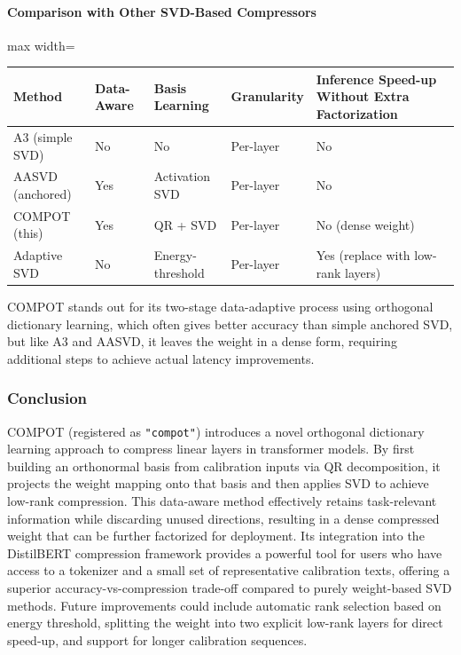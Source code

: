 \paragraph{Comparison with Other SVD-Based Compressors}

\begin{center}
\begin{adjustbox}{max width=\columnwidth}
\renewcommand{\arraystretch}{1.2}
\begin{tabular}{lllll}
\toprule
Method & Data-Aware & Basis Learning & Granularity & Inference Speed-up Without Extra Factorization \\
\midrule
A3 (simple SVD) & No & No & Per-layer & No \\
AASVD (anchored) & Yes & Activation SVD & Per-layer & No \\
COMPOT (this) & Yes & QR + SVD & Per-layer & No (dense weight) \\
Adaptive SVD & No & Energy-threshold & Per-layer & Yes (replace with low-rank layers) \\

\bottomrule
\end{tabular}
\end{adjustbox}
\end{center}
COMPOT stands out for its two-stage data-adaptive process using orthogonal dictionary learning, which often gives better accuracy than simple anchored SVD, but like A3 and AASVD, it leaves the weight in a dense form, requiring additional steps to achieve actual latency improvements.


\subsubsection*{Conclusion}

COMPOT (registered as \texttt{"compot"}) introduces a novel orthogonal dictionary learning approach to compress linear layers in transformer models. By first building an orthonormal basis from calibration inputs via QR decomposition, it projects the weight mapping onto that basis and then applies SVD to achieve low-rank compression. This data-aware method effectively retains task-relevant information while discarding unused directions, resulting in a dense compressed weight that can be further factorized for deployment. Its integration into the DistilBERT compression framework provides a powerful tool for users who have access to a tokenizer and a small set of representative calibration texts, offering a superior accuracy-vs-compression trade-off compared to purely weight-based SVD methods. Future improvements could include automatic rank selection based on energy threshold, splitting the weight into two explicit low-rank layers for direct speed-up, and support for longer calibration sequences.


